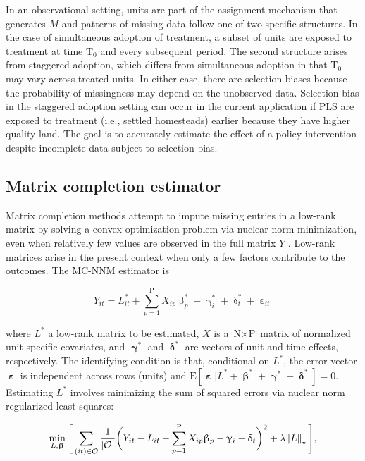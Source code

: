 \documentclass[hidelinks,12pt]{article}
\newcommand{\E}{\mathrm{E}}
\begin{document}
In an observational setting, units are part of the assignment mechanism that generates $M$ and patterns of missing data follow one of two specific structures. In the case of simultaneous adoption of treatment, a subset of units are exposed to treatment at time $\text{T}_0$ and every subsequent period. The second structure arises from staggered adoption, which differs from simultaneous adoption in that $\text{T}_0$ may vary across treated units. In either case, there are selection biases because the probability of missingness may depend on the unobserved data. Selection bias in the staggered adoption setting can occur in the current application if PLS are exposed to treatment (i.e., settled homesteads) earlier because they have higher quality land. The goal is to accurately estimate the effect of a policy intervention despite incomplete data subject to selection bias. 

\subsection{Matrix completion estimator}

Matrix completion methods attempt to impute missing entries in a low-rank matrix by solving a convex optimization problem via nuclear norm minimization, even when relatively few values are observed in the full matrix $Y$ \citep{candes2009exact,candes2010matrix}. Low-rank matrices arise in the present context when only a few factors contribute to the outcomes. The MC-NNM estimator is 

\begin{equation}
Y_{it} = L_{it}^{*} + \sum_{p=1}^{\text{P}} X_{ip} \upbeta_{p}^{*} + \upgamma_{i}^{*} + \updelta_{t}^{*} + \upepsilon_{it} \label{eq:mc-Y}
\end{equation}

\noindent
where $L^{*}$ a low-rank matrix to be estimated, $X$ is a $\text{N} \times \text{P}$ matrix of normalized unit-specific covariates, and $\boldsymbol{\upgamma}^{*}$ and $\boldsymbol{\updelta}^{*}$ are vectors of unit and time effects, respectively. The identifying condition is that, conditional on $L^{*}$, the error vector $\boldsymbol{\upepsilon}$ is independent across rows (units) and $\E[\boldsymbol{\upepsilon} | L^{*} + \boldsymbol{\upbeta}^{*} + \boldsymbol{\upgamma}^{*} + \boldsymbol{\updelta}^{*}] = 0$. Estimating $L^{*}$ involves minimizing the sum of squared errors via nuclear norm regularized least squares:

\begin{equation}
\min_{L, \boldsymbol{\upbeta}} \Bigg[\sum_{(it) \in \mathcal{O}} \frac{1}{|\mathcal{O}|} \bigg(Y_{it} - L_{it} - \sum_{p=1}^{\text{P}} X_{ip} \upbeta_p - \upgamma_{i} - \updelta_{t} \bigg)^2 + \lambda \norm{L}_\star \Bigg], \label{eq:mc-opt}
\end{equation}
\end{document}
